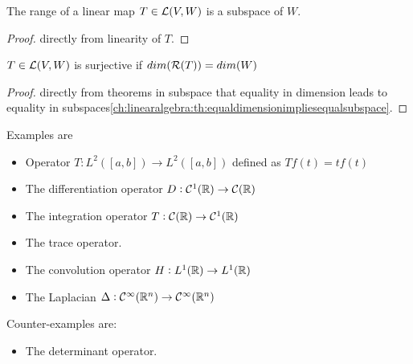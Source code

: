 \begin{refsection}
\begin{lemma}
The range of a linear map $T\in \mathcal{L}(V,W)$ is a subspace of $W$.
\end{lemma}
\begin{proof}
	directly from linearity of $T$.
\end{proof}


\begin{lemma}
$T\in \mathcal{L}(V,W)$ is surjective if $dim(\mathcal{R}(T)) = dim(W)$
\end{lemma}
\begin{proof}
directly from theorems in subspace that equality in dimension leads to equality in subspaces\autoref{ch:linearalgebra:th:equaldimensionimpliesequalsubspace}.
\end{proof}
 

\begin{example}
Examples are \cite{krim2015geometric}
\begin{itemize}
    \item Operator $T: L^2([a,b])\rightarrow L^2([a,b])$ defined as $T f(t)=t f(t)$
    \item The differentiation operator $D:\mathcal{C}^1(\mathbb{R})\rightarrow \mathcal{C}(\mathbb{R})$
     \item The integration operator $T:\mathcal{C}(\mathbb{R}) \rightarrow \mathcal{C}^1(\mathbb{R})$
     \item The trace operator. 
     \item The convolution operator $H: L^1(\mathbb{R})\rightarrow L^1(\mathbb{R})$
     \item The Laplacian $\Delta: \mathcal{C}^\infty(\mathbb{R}^n)\rightarrow \mathcal{C}^\infty(\mathbb{R}^n)$
\end{itemize}

Counter-examples are:
\begin{itemize}
    \item The determinant operator.
\end{itemize}
\end{example}


\end{refsection}
